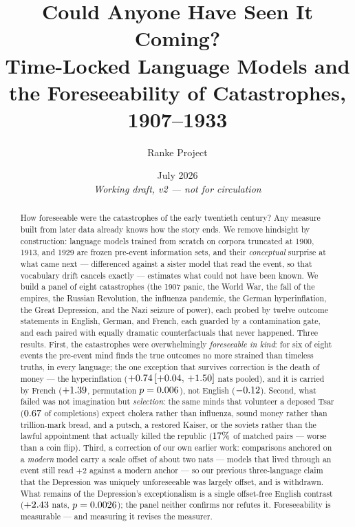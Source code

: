 \documentclass[11pt]{article}
\title{\bfseries Could Anyone Have Seen It Coming?\\ Time-Locked Language Models and the Foreseeability of Catastrophes, 1907--1933}
\author{Ranke Project}
\date{July 2026 \\[4pt] \small \emph{Working draft, v2 --- not for circulation}}
\begin{document}
\maketitle

\begin{abstract}
\noindent How foreseeable were the catastrophes of the early twentieth century? Any measure built from
later data already knows how the story ends. We remove hindsight by construction: language models trained
from scratch on corpora truncated at 1900, 1913, and 1929 are frozen pre-event information sets, and their
\emph{conceptual} surprise at what came next --- differenced against a sister model that read the event, so
that vocabulary drift cancels exactly --- estimates what could not have been known. We build a panel of
eight catastrophes (the 1907 panic, the World War, the fall of the empires, the Russian Revolution, the
influenza pandemic, the German hyperinflation, the Great Depression, and the Nazi seizure of power), each
probed by twelve outcome statements in English, German, and French, each guarded by a contamination gate,
and each paired with equally dramatic counterfactuals that never happened. Three results. First, the
catastrophes were overwhelmingly \emph{foreseeable in kind}: for six of eight events the pre-event mind
finds the true outcomes no more strained than timeless truths, in every language; the one exception that
survives correction is the death of money --- the hyperinflation ($+0.74\,[+0.04,\,+1.50]$ nats pooled), and it is
carried by French ($+1.39$, permutation $p=0.006$), not English ($-0.12$). Second, what
failed was not imagination but \emph{selection}: the same minds that volunteer a deposed Tsar
($0.67$ of completions) expect cholera rather than influenza, sound money rather than
trillion-mark bread, and a putsch, a restored Kaiser, or the soviets rather than the lawful appointment
that actually killed the republic ($17\%$ of matched pairs --- worse than a coin flip). Third, a
correction of our own earlier work: comparisons anchored on a \emph{modern} model carry a scale offset of
about two nats --- models that lived through an event still read $+2$ against a modern anchor --- so our
previous three-language claim that the Depression was uniquely unforeseeable was largely offset, and is
withdrawn. What remains of the Depression's exceptionalism is a single offset-free English contrast
($+2.43$ nats, $p=0.0026$); the panel neither confirms nor refutes it. Foreseeability is
measurable --- and measuring it revises the measurer.
\end{abstract}
\end{document}
